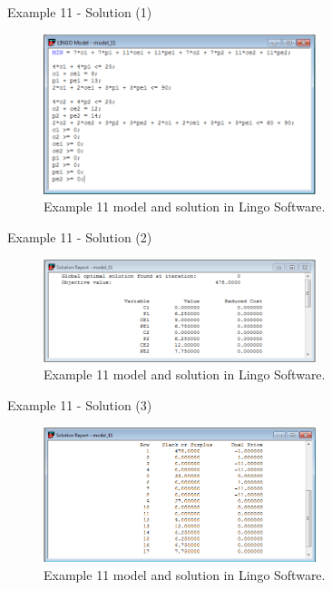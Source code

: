 \begin{frame}{Example 11 - Solution (1)}
\begin{figure}
    \includegraphics[width=300px]{slides/ex11/screenshot_a.png}
    \caption{Example 11 model and solution in Lingo Software.}
\end{figure}
\end{frame}

\begin{frame}{Example 11 - Solution (2)}
\begin{figure}
    \includegraphics[width=300px]{slides/ex11/screenshot_b.png}
    \caption{Example 11 model and solution in Lingo Software.}
\end{figure}
\end{frame}

\begin{frame}{Example 11 - Solution (3)}
\begin{figure}
    \includegraphics[width=300px]{slides/ex11/screenshot_c.png}
    \caption{Example 11 model and solution in Lingo Software.}
\end{figure}
\end{frame}


